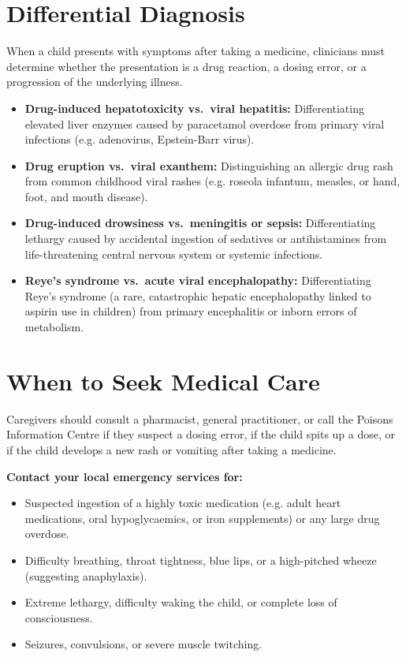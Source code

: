 \section*{Differential Diagnosis}
When a child presents with symptoms after taking a medicine, clinicians must determine whether the presentation is a drug reaction, a dosing error, or a progression of the underlying illness.
\begin{itemize}
    \item \textbf{Drug-induced hepatotoxicity vs.\ viral hepatitis:} Differentiating elevated liver enzymes caused by paracetamol overdose from primary viral infections (e.g. adenovirus, Epstein-Barr virus).
    \item \textbf{Drug eruption vs.\ viral exanthem:} Distinguishing an allergic drug rash from common childhood viral rashes (e.g. roseola infantum, measles, or hand, foot, and mouth disease).
    \item \textbf{Drug-induced drowsiness vs.\ meningitis or sepsis:} Differentiating lethargy caused by accidental ingestion of sedatives or antihistamines from life-threatening central nervous system or systemic infections.
    \item \textbf{Reye's syndrome vs.\ acute viral encephalopathy:} Differentiating Reye's syndrome (a rare, catastrophic hepatic encephalopathy linked to aspirin use in children) from primary encephalitis or inborn errors of metabolism.
\end{itemize}

\section*{When to Seek Medical Care}
Caregivers should consult a pharmacist, general practitioner, or call the Poisons Information Centre if they suspect a dosing error, if the child spits up a dose, or if the child develops a new rash or vomiting after taking a medicine.

\textbf{Contact your local emergency services for:}
\begin{itemize}
    \item Suspected ingestion of a highly toxic medication (e.g. adult heart medications, oral hypoglycaemics, or iron supplements) or any large drug overdose.
    \item Difficulty breathing, throat tightness, blue lips, or a high-pitched wheeze (suggesting anaphylaxis).
    \item Extreme lethargy, difficulty waking the child, or complete loss of consciousness.
    \item Seizures, convulsions, or severe muscle twitching.
\end{itemize}

